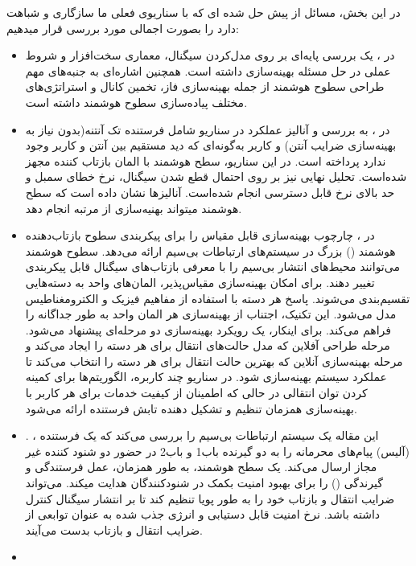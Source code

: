 در این بخش، مسائل از پیش حل شده ای که با سناریوی فعلی ما سازگاری و شباهت دارد را بصورت اجمالی مورد بررسی قرار میدهیم:

\begin{itemize}
	\item 
	در 
	\cite{3}
	، یک بررسی پایه‌ای بر روی مدل‌کردن سیگنال، معماری سخت‌افزار و شروط عملی در حل مسئله بهینه‌سازی داشته است.
	همچنین اشاره‌ای به جنبه‌های مهم طراحی سطوح هوشمند از جمله بهینه‌سازی فاز، تخمین کانال و استراتژی‌های مختلف پیاده‌سازی سطوح هوشمند داشته است. 
	\item 
	در 
	\cite{4}
	، به بررسی و آنالیز عملکرد  در سناریو شامل فرستنده تک آنتنه(بدون نیاز به بهینه‌سازی ضرایب آنتن) و کاربر به‌گونه‌ای که دید مستقیم بین آنتن و کاربر وجود ندارد پرداخته است. در این سناریو، سطح هوشمند با  المان بازتاب کننده مجهز شده‌است. تحلیل نهایی نیز بر روی احتمال قطع شدن سیگنال، نرخ خطای سمبل و حد بالای نرخ قابل دسترسی انجام شده‌است. آنالیزها نشان داده‌ است که سطح هوشمند میتواند بهنیه‌سازی از مرتبه  انجام دهد.
	\item 
	در 
	\cite{5}
	، چارچوب بهینه‌سازی قابل مقیاس را برای پیکربندی سطوح بازتاب‌دهنده هوشمند () بزرگ در سیستم‌های ارتباطات بی‌سیم ارائه می‌دهد. سطوح هوشمند می‌توانند محیط‌های انتشار بی‌سیم را با معرفی بازتاب‌های سیگنال قابل پیکربندی تغییر دهند. برای امکان بهینه‌سازی مقیاس‌پذیر، المان‌های واحد  به دسته‌هایی تقسیم‌بندی می‌شوند. پاسخ هر دسته با استفاده از مفاهیم فیزیک و الکترومغناطیس مدل می‌شود. این تکنیک، اجتناب از بهینه‌سازی هر المان واحد به طور جداگانه را فراهم می‌کند. برای اینکار، یک رویکرد بهینه‌سازی دو مرحله‌ای پیشنهاد می‌شود. مرحله طراحی آفلاین که مدل حالت‌های انتقال برای هر دسته را ایجاد می‌کند و مرحله بهینه‌سازی آنلاین که بهترین حالت انتقال برای هر دسته را انتخاب می‌کند تا عملکرد سیستم بهینه‌سازی شود. در سناریو  چند کاربره، الگوریتم‌ها برای کمینه کردن توان انتقالی در حالی که اطمینان از کیفیت خدمات برای هر کاربر با بهینه‌سازی همزمان تنظیم  و تشکیل دهنده تابش فرستنده ارائه می‌شود.
	\item 
	. 
	\cite{6}
	، این مقاله یک سیستم ارتباطات بی‌سیم را بررسی می‌کند که یک فرستنده (آلیس) پیام‌های محرمانه را به دو گیرنده باب1 و باب2 در حضور دو شنود کننده غیر مجاز ارسال می‌کند. یک سطح هوشمند، به طور همزمان، عمل فرستندگی و گیرندگی () را برای بهبود امنیت بکمک  در شنودکنندگان هدایت میکند.  می‌تواند ضرایب انتقال و بازتاب خود را به طور پویا تنظیم کند تا بر انتشار سیگنال کنترل داشته باشد. نرخ امنیت قابل دستیابی و انرژی جذب شده به عنوان توابعی از ضرایب انتقال و بازتاب بدست می‌آیند.
	\item 

\end{itemize}

